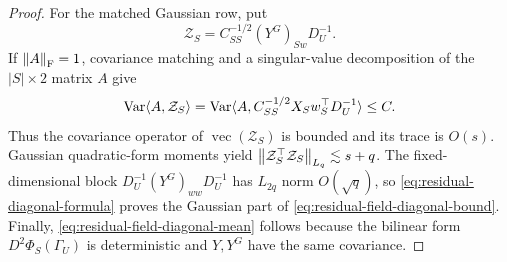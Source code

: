 \begin{proof}
For the matched Gaussian row, put
\[
 \mathcal Z_S=C_{SS}^{-1/2}(Y^G)_{Sw}D_U^{-1}.
\]
If $\left\lVert A\right\rVert_{\mathrm F}=1$, covariance matching and a singular-value
decomposition of the $|S|\times2$ matrix $A$ give
\[
 \operatorname{Var}\langle A,\mathcal Z_S\rangle
 =\operatorname{Var}\langle A,C_{SS}^{-1/2}X_Sw_S^\top D_U^{-1}\rangle
 \le C.
\]
Thus the covariance operator of $\operatorname{vec}(\mathcal Z_S)$ is
bounded and its trace is $O(s)$.  Gaussian quadratic-form moments yield
$\left\lVert \mathcal Z_S^\top\mathcal Z_S\right\rVert_{L_q}\lesssim s+q$.
The fixed-dimensional block
$D_U^{-1}(Y^G)_{ww}D_U^{-1}$ has $L_{2q}$ norm $O(\sqrt q)$, so
\eqref{eq:residual-diagonal-formula} proves the Gaussian part of
\eqref{eq:residual-field-diagonal-bound}.  Finally,
\eqref{eq:residual-field-diagonal-mean} follows because the bilinear form
$D^2\Phi_S(\Gamma_U)$ is deterministic and $Y,Y^G$ have the same
covariance.
\end{proof}

